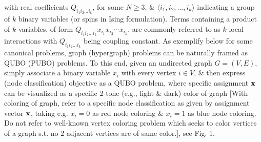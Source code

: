 \documentclass{article}
\begin{document}
\begin{itemize}
\begin{equation*}
    \end{equation*}
    with real coefficients $Q_{i_1i_2\ldots i_k}$, for some $N\ge3$, \& $\langle i_1,i_2,\ldots,i_k\rangle$ indicating a group of $k$ binary variables (or spins in Ising formulation). Terms containing a product of $k$ variables, of form $Q_{i_1i_2\ldots i_k}x_{i_1}x_{i_2}\cdots x_{i_k}$, are commonly referred to as $k$-local interactions with $Q_{i_1i_2\ldots i_k}$ being coupling constant. As exemplify below for some canonical problems, graph (hypergraph) problems can be naturally framed as QUBO (PUBO) problems. To this end, given an undirected graph $G = (V,E)$, simply associate a binary variable $x_i$ with every vertex $i\in V$, \& then express (node classification) objective as a QUBO problem, where specific assignment ${\bf x}$ can be visualized as a specific 2-tone (e.g., light \& dark) color of graph [With coloring of graph, refer to a specific node classification as given by assignment vector ${\bf x}$, taking e.g. $x_i = 0$ as red node coloring \& $x_i = 1$ as blue node coloring. Do not refer to well-known vertex coloring problem which seeks to color vertices of a graph s.t. no 2 adjacent vertices are of same color.], see {\sf Fig. 1.}


\end{itemize}
\end{document}
